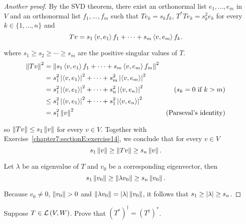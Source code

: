 \begin{proof}[Another proof]
    By the SVD theorem, there exist an orthonormal list $e_{1}, \ldots, e_{m}$ in $V$ and an orthonormal list $f_{1}, \ldots, f_{m}$ such that $Te_{k} = s_{k}f_{k}$, $T^{*}Te_{k} = s_{k}^{2}e_{k}$ for every $k\in\{1,\ldots,n\}$ and
    \[
        Tv = s_{1}\left\langle{v,e_{1}}\right\rangle f_{1} + \cdots + s_{m}\left\langle{v,e_{m}}\right\rangle f_{k}.
    \]

    where $s_{1}\geq s_{2}\geq \cdots \geq s_{m}$ are the positive singular values of $T$.
    \begin{align*}
        \left\Vert{Tv}\right\Vert^{2} & = \left\Vert{s_{1}\left\langle{v,e_{1}}\right\rangle f_{1} + \cdots + s_{m}\left\langle{v,e_{m}}\right\rangle f_{m}}\right\Vert^{2}                                              \\
                      & = s_{1}^{2}\left\vert{\left\langle{v, e_{1}}\right\rangle}\right\vert^{2} + \cdots + s_{m}^{2}\left\vert{\left\langle{v, e_{m}}\right\rangle}\right\vert^{2}                                     \\
                      & = s_{1}^{2}\left\vert{\left\langle{v, e_{1}}\right\rangle}\right\vert^{2} + \cdots + s_{n}^{2}\left\vert{\left\langle{v, e_{n}}\right\rangle}\right\vert^{2}   & \text{($s_{k} = 0$ if $k > m$)} \\
                      & \leq s_{1}^{2}\left\vert{\left\langle{v, e_{1}}\right\rangle}\right\vert^{2} + \cdots + s_{1}^{2}\left\vert{\left\langle{v,e_{n}}\right\rangle}\right\vert^{2}                                   \\
                      & = s_{1}^{2}\left\Vert{v}\right\Vert^{2}                                                                        & \text{(Parseval's identity)}
    \end{align*}

    so $\left\Vert{Tv}\right\Vert\leq s_{1}\left\Vert{v}\right\Vert$ for every $v\in V$. Together with Exercise~\ref{chapter7:sectionE:exercise14}, we conclude that for every $v\in V$
    \[
        s_{1}\left\Vert{v}\right\Vert\geq \left\Vert{Tv}\right\Vert\geq s_{n}\left\Vert{v}\right\Vert.
    \]

    Let $\lambda$ be an eigenvalue of $T$ and $v_{0}$ be a corresponding eigenvector, then
    \[
        s_{1}\left\Vert{v_{0}}\right\Vert\geq \left\Vert{\lambda v_{0}}\right\Vert\geq s_{n}\left\Vert{v_{0}}\right\Vert.
    \]

    Because $v_{0}\ne 0$, $\left\Vert{v_{0}}\right\Vert > 0$ and $\left\Vert{\lambda v_{0}}\right\Vert = \left\vert{\lambda}\right\vert\left\Vert{v_{0}}\right\Vert$, it follows that $s_{1}\geq \left\vert{\lambda}\right\vert \geq s_{n}$.
\end{proof}
\newpage

\begin{exercise}\label{chapter7:sectionE:exercise16}
    Suppose $T\in\mathcal{L}\left({V, W}\right)$. Prove that ${(T^{*})}^{\dagger} = {(T^{\dagger})}^{*}$.
\end{exercise}

